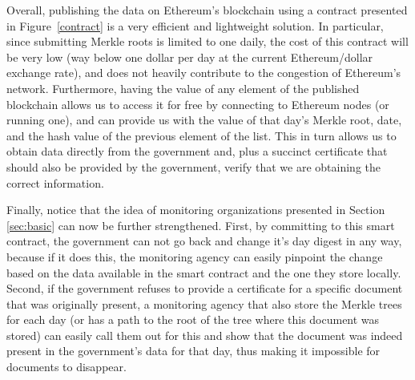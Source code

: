 Overall, publishing the data on Ethereum's blockchain using a contract presented in Figure~\ref{contract} is a very efficient and lightweight solution. In particular, since submitting Merkle roots is limited to one daily, the cost of this contract will be very low (way below one dollar per day at the current Ethereum/dollar exchange rate), and does not heavily contribute to the congestion of Ethereum's network. Furthermore, having the value of any element of the published blockchain allows us to access it for free by connecting to Ethereum nodes (or running one), and can provide us with the value of that day's Merkle root, date, and the hash value of the previous element of the list. This in turn allows us to obtain data directly from the government and, plus a succinct certificate that should also be provided by the government, verify that we are obtaining the correct information.


Finally, notice that the idea of monitoring organizations presented in Section \ref{sec:basic} can now be further strengthened. First, by committing to this smart contract, the government can not go back and change it's day digest in any way, because if it does this, the monitoring agency can easily pinpoint the change based on the data available in the smart contract and the one they store locally. Second, if the government refuses to provide a certificate for a specific document that was originally present, a monitoring agency that also store the Merkle trees for each day (or has a path to the root of the tree where this document was stored) can easily call them out for this and show that the document was indeed present in the government's data for that day, thus making it impossible for documents to disappear.



